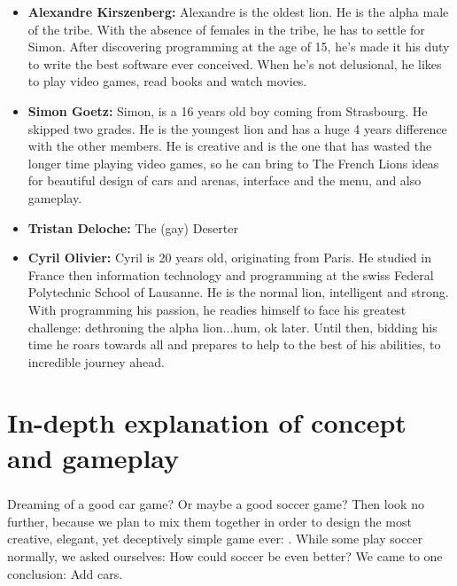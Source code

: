 \begin{itemize}
    \item \textbf{Alexandre Kirszenberg:}{
    Alexandre is the oldest lion. He is the alpha male of the tribe. With the absence of females in the tribe, he has to settle for Simon. After discovering programming at the age of 15, he’s made it his duty to write the best software ever conceived. When he’s not delusional, he likes to play video games, read books and watch movies.}\\


    \item \textbf{Simon Goetz:}{
    Simon, is a 16 years old boy coming from Strasbourg. He skipped two grades. He is the youngest lion and has a huge 4 years difference with the other members. He is creative and is the one that has wasted the longer time playing video games, so he can bring to The French Lions ideas for beautiful design of cars and arenas, interface and the menu, and also gameplay.}\\

    \item \textbf{Tristan Deloche:}{
    The (gay) Deserter}\\

    \item \textbf{Cyril Olivier:}{
    Cyril is 20 years old, originating from Paris. He studied in France then information technology and programming at the swiss Federal Polytechnic School of Lausanne. He is the normal lion, intelligent and strong. With programming his passion, he readies himself to face his greatest challenge: dethroning the alpha lion...hum, ok later. Until then, bidding his time he roars towards all and prepares to help to the best of his abilities, to incredible journey ahead.}\\
    
\end{itemize}


\chapter{In-depth explanation of concept and gameplay}

\paragraph{}Dreaming of a good car game? Or maybe a good soccer game? Then look no further, because we plan to mix them together in order to design the most creative, elegant, yet deceptively simple game ever: \FR. While some play soccer normally, we asked ourselves: How could soccer be even better? We came to one conclusion: Add cars.\\

